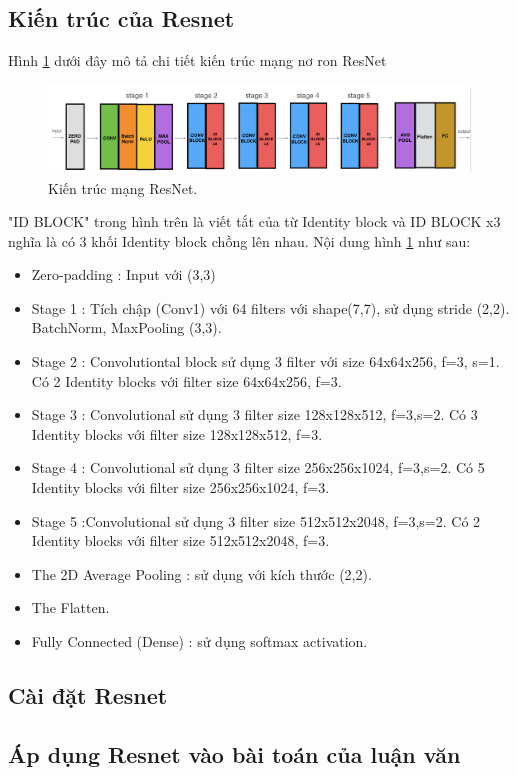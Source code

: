 \subsection{Kiến trúc của Resnet}
Hình \ref{fig:resnet_architecture} dưới đây mô tả chi tiết kiến trúc mạng nơ ron ResNet
\begin{figure}[H]
	\centering
	\includegraphics[width=1\linewidth]{images/resnet_architecture}
	\caption{Kiến trúc mạng ResNet.}
	\label{fig:resnet_architecture}
\end{figure}
"ID BLOCK" trong hình trên là viết tắt của từ Identity block và ID BLOCK x3 nghĩa là có 3 khối Identity block chồng lên nhau. Nội dung hình \ref{fig:resnet_architecture} như sau:
\begin{itemize}
	\item Zero-padding : Input với (3,3)
	\item Stage 1 : Tích chập (Conv1) với 64 filters với shape(7,7), sử dụng stride (2,2). BatchNorm, MaxPooling (3,3).
	\item Stage 2 : Convolutiontal block sử dụng 3 filter với size 64x64x256, f=3, s=1. Có 2 Identity blocks với filter size 64x64x256, f=3.
	\item Stage 3 : Convolutional sử dụng 3 filter size 128x128x512, f=3,s=2. Có 3 Identity blocks với filter size 128x128x512, f=3.
	\item Stage 4 : Convolutional sử dụng 3 filter size 256x256x1024, f=3,s=2. Có 5 Identity blocks với filter size 256x256x1024, f=3.
	\item Stage 5 :Convolutional sử dụng 3 filter size 512x512x2048, f=3,s=2. Có 2 Identity blocks với filter size 512x512x2048, f=3.
	\item The 2D Average Pooling : sử dụng với kích thước (2,2).
	\item The Flatten.
	\item Fully Connected (Dense) : sử dụng softmax activation.
\end{itemize}

\subsection{Cài đặt Resnet}


\subsection{Áp dụng Resnet vào bài toán của luận văn}